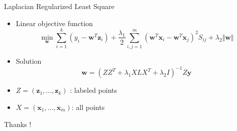 \documentclass{beamer}
\newcommand{\bol}[1]{\textbf{#1}}
\begin{document}
\begin{darkframes}
  \begin{frame}{Laplacian Regularized Least Square}
  \begin{itemize}
  \item Linear objective function
  \begin{displaymath}
  	\min_{\bol{w}}\sum_{i=1}^k\left( y_i - \bol{w}^T\bol{z}_i \right) + \frac{\lambda_1}{2}\sum_{i,j=1}^m\left(  \bol{w}^T\bol{x}_i - \bol{w}^T\bol{x}_j  \right)^2S_{ij} + \lambda_2\Vert\bol{w}\Vert
  \end{displaymath}
  \item Solution
  \begin{displaymath}
  	\bol{w} = \left(  ZZ^T + \lambda_1XLX^T + \lambda_2I  \right)^{-1}Z\bol{y}
  \end{displaymath}
  \item $Z=(\bol{z}_1,\ldots,\bol{z}_k)$ : labeled points
  \item $X=(\bol{x}_1, \ldots, \bol{x}_m)$: all points
  \end{itemize}
  \end{frame}
  
    \begin{frame}
		\centering\Huge{Thanks !}
	\end{frame}	  
    \end{darkframes}
\end{document}
